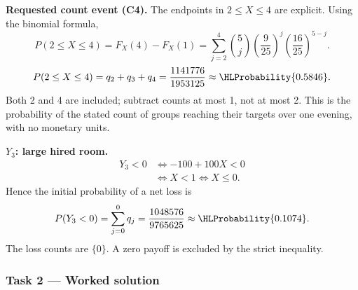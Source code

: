 \textbf{Requested count event (C4).} The endpoints in $2\leq X\leq 4$ are explicit. Using the binomial formula,
\[P(2\leq X\leq 4)=F_X(4)-F_X(1)=\sum_{j=2}^{4}\binom{5}j(\frac{9}{25})^j(\frac{16}{25})^{5-j}.\]
\[P(2\leq X\leq 4)=q_{2}+q_{3}+q_{4}=\frac{1141776}{1953125}\approx\HLProbability{0.5846}.\]
Both 2 and 4 are included; subtract counts at most 1, not at most 2.
This is the probability of the stated count of groups reaching their targets over one evening, with no monetary units.
\par\noindent\begin{minipage}[t]{.48\linewidth}\vspace{0pt}
\textbf{$Y_3$: large hired room.}
\[
\begin{aligned}
Y_3<0&\iff -100+100X<0\\
&\iff X<1\iff X\leq 0.
\end{aligned}
\]
Hence the initial probability of a net loss is
\[
P(Y_3<0)=\sum_{j=0}^{0}q_j
=\frac{1048576}{9765625}\approx\HLProbability{0.1074}.
\]
The loss counts are $\{0\}$. A zero payoff is excluded by the strict inequality.
\end{minipage}\par
{}
\clearpage
\subsubsection*{Task 2 --- Worked solution}\label{sol:c4-restaurant-decision}
